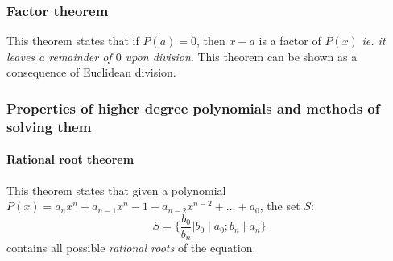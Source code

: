 \subsubsection{Factor theorem}
This theorem states that if $P(a) = 0$, then $x-a$ is a factor of $P(x)$ \textit{ie. it leaves a remainder of $0$ upon division}.
This theorem can be shown as a consequence of Euclidean division.

\subsubsection{Properties of higher degree polynomials and methods of solving them}
\paragraph{Rational root theorem}
This theorem states that given a polynomial $P(x) = a_nx^n + a_{n-1}x^n-1 + a_{n-2}x^{n-2} +\ldots +a_0$, the set $S$:
$$ S = \{\dfrac{b_0}{b_n} | b_0\mid a_0; b_n\mid a_n\} $$
contains all possible \emph{rational roots} of the equation.
